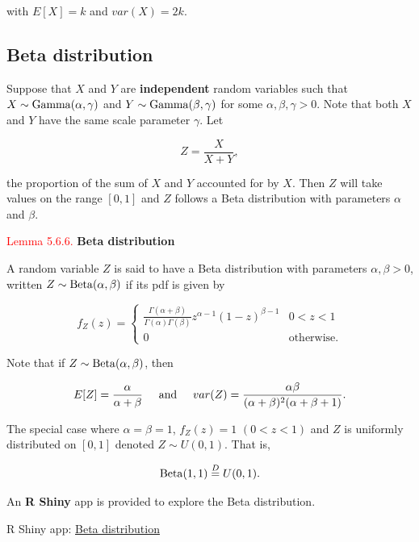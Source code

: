 \documentclass[
]{book}
\begin{document}
with \(E[X] =k\) and \(var(X) =2k\).

\hypertarget{rv:exponential:beta}{%
\subsection{Beta distribution}\label{rv:exponential:beta}}

Suppose that \(X\) and \(Y\) are \textbf{independent} random variables such that \(X \sim {\rm Gamma} (\alpha, \gamma)\) and \(Y \sim {\rm Gamma} (\beta, \gamma)\) for some \(\alpha, \beta, \gamma >0\). Note that both \(X\) and \(Y\) have the same scale parameter \(\gamma\). Let

\[ Z = \frac{X}{X+Y},\]

the proportion of the sum of \(X\) and \(Y\) accounted for by \(X\). Then \(Z\) will take values on the range \([0,1]\) and \(Z\) follows a Beta distribution with parameters \(\alpha\) and \(\beta\).

\leavevmode{}%
\textcolor{red}{Lemma 5.6.6.}
{\textbf{Beta distribution}}

A random variable \(Z\) is said to have a Beta distribution with
parameters \(\alpha, \beta > 0\), written \(Z \sim {\rm Beta} (\alpha, \beta)\) if its pdf is given by

\[ f_Z (z) = \left\{ \begin{array}{ll} \frac{\Gamma (\alpha + \beta)}{
\Gamma (\alpha) \Gamma (\beta)} z^{\alpha -1} (1- z)^{\beta -1} & 0 < z < 1 \\
0 & \mbox{otherwise.} \end{array} \right. \]

Note that if \(Z \sim {\rm Beta} (\alpha, \beta)\), then

\[ E[Z] = \frac{\alpha}{\alpha+\beta} \hspace{.5cm} \mbox{and} \hspace{.5cm} var (Z) = \frac{\alpha \beta}{(\alpha + \beta)^2 (\alpha + \beta +1)}.  \]

The special case where \(\alpha = \beta =1\), \(f_Z (z)=1\) \((0<z<1)\) and \(Z\) is uniformly distributed on \([0,1]\) denoted \(Z \sim U(0,1)\). That is,

\[ {\rm Beta} (1,1) \stackrel{D}{=} U(0,1). \]

An \textbf{R Shiny} app is provided to explore the Beta distribution.

R Shiny app: \href{https://shiny-new.maths.nottingham.ac.uk/pmzpn/Beta/}{Beta distribution}
\end{document}
